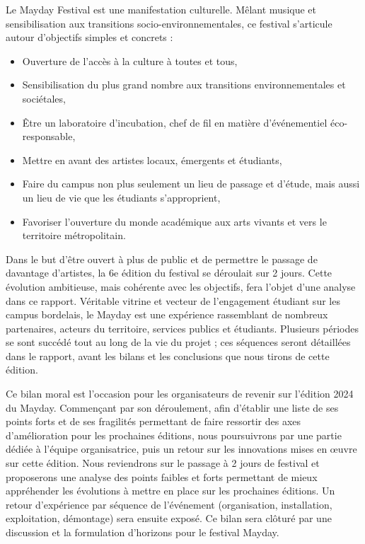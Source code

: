 \documentclass[12pt,a4paper]{report}
\begin{document}
Le Mayday Festival est une manifestation culturelle. Mêlant musique et sensibilisation aux transitions socio-environnementales, ce festival s'articule autour d'objectifs simples et concrets :
\begin{itemize}
\item Ouverture de l’accès à la culture à toutes et tous,
\item Sensibilisation du plus grand nombre aux transitions environnementales et sociétales,
\item Être un laboratoire d’incubation, chef de fil en matière d’événementiel éco-responsable,
\item Mettre en avant des artistes locaux, émergents et étudiants,
\item Faire du campus non plus seulement un lieu de passage et d'étude, mais aussi un lieu de vie que les étudiants s'approprient,
\item Favoriser l’ouverture du monde académique aux arts vivants et vers le territoire métropolitain.
\end{itemize}
Dans le but d’être ouvert à plus de public et de permettre le passage de davantage d’artistes, la 6e édition du festival se déroulait sur 2 jours. Cette évolution ambitieuse, mais cohérente avec les objectifs, fera l’objet d’une analyse dans ce rapport. Véritable vitrine et vecteur de l'engagement étudiant sur les campus bordelais, le Mayday est une expérience rassemblant de nombreux partenaires, acteurs du territoire, services publics et étudiants. Plusieurs périodes se sont succédé tout au long de la vie du projet ; ces séquences seront détaillées dans le rapport, avant les bilans et les conclusions que nous tirons de cette édition.

Ce bilan moral est l’occasion pour les organisateurs de revenir sur l’édition 2024 du Mayday. Commençant par son déroulement, afin d’établir une liste de ses points forts et de ses fragilités permettant de faire ressortir des axes d’amélioration pour les prochaines éditions, nous poursuivrons par une partie dédiée à l'équipe organisatrice, puis un retour sur les innovations mises en œuvre sur cette édition. Nous reviendrons sur le passage à 2 jours de festival et proposerons une analyse des points faibles et forts permettant de mieux appréhender les évolutions à mettre en place sur les prochaines éditions. Un retour d'expérience par séquence de l'événement (organisation, installation, exploitation, démontage) sera ensuite exposé. Ce bilan sera clôturé par une discussion et la formulation d'horizons pour le festival Mayday.
\end{document}
